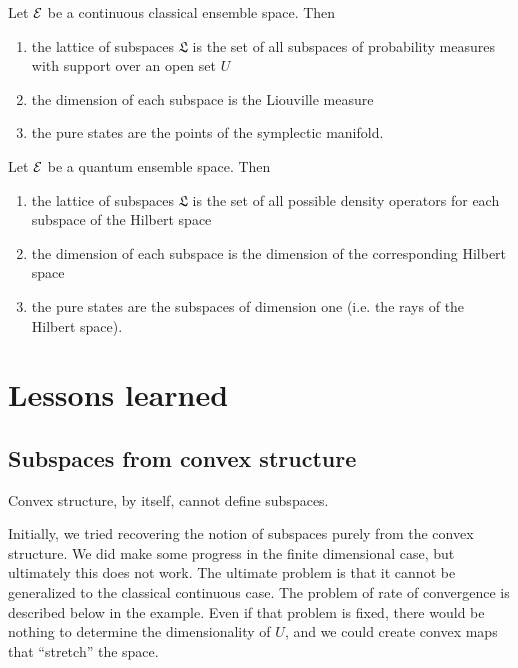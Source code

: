 \begin{conj}
	Let $\mathcal{E}$ be a continuous classical ensemble space. Then
	\begin{enumerate}
		\item the lattice of subspaces $\mathfrak{L}$ is the set of all subspaces of probability measures with support over an open set $U$
		\item the dimension of each subspace is the Liouville measure
		\item the pure states are the points of the symplectic manifold.
	\end{enumerate}
\end{conj}

\begin{conj}
	Let $\mathcal{E}$ be a quantum ensemble space. Then
	\begin{enumerate}
		\item the lattice of subspaces $\mathfrak{L}$ is the set of all possible density operators for each subspace of the Hilbert space
		\item the dimension of each subspace is the dimension of the corresponding Hilbert space
		\item the pure states are the subspaces of dimension one (i.e. the rays of the Hilbert space).
	\end{enumerate}
\end{conj}

\section{Lessons learned}

\subsection{Subspaces from convex structure}

\begin{insight}
	Convex structure, by itself, cannot define subspaces.
\end{insight}

Initially, we tried recovering the notion of subspaces purely from the convex structure. We did make some progress in the finite dimensional case, but ultimately this does not work. The ultimate problem is that it cannot be generalized to the classical continuous case. The problem of rate of convergence is described below in the example. Even if that problem is fixed, there would be nothing to determine the dimensionality of $U$, and we could create convex maps that ``stretch'' the space.

